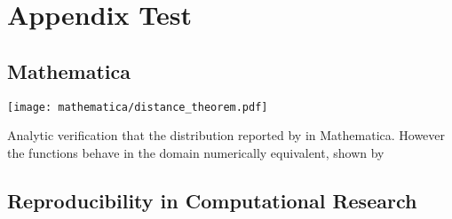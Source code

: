 
\chapter{Appendix Test}



\section{Mathematica}

\texttt{[image: mathematica/distance\_theorem.pdf]}

\begin{remark} Analytic verification that the distribution reported by
  \textcite{Moltchanov2012} in Mathematica.
However the functions behave in the domain numerically equivalent,
shown by 
\end{remark}




\section{Reproducibility in Computational Research}\label{sec:reproducibility}

\textcite{Sumatra2012}








